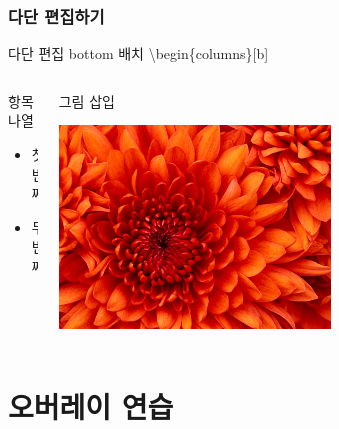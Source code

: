 \documentclass[10pt,blue,xcolor=pdftex,dvipsnames,table,handout]{beamer}
\begin{document}
		\begin{frame}[t]
		\frametitle{다단 편집하기}

			\begin{example} {다단 편집 bottom 배치}
			\textbackslash begin\{columns\}[b]
			\end{example}

		\begin{columns}[b]
		\begin{column}{.5\textwidth}

			\begin{block} {항목 나열}
			\begin{itemize}
			\item 첫 번째
			\item 두 번째
			\end{itemize}
			\end{block}

		\end{column}

		\begin{column}{.4\textwidth}

			\begin{block} {그림 삽입}
			\centerline{\includegraphics[scale=1.0,width=0.6\textwidth]{./fig/Chrysanthemum.jpg}}
			\end{block}

		\end{column}
		\end{columns}
		\end{frame}



		\section{오버레이 연습} 
\end{document}
